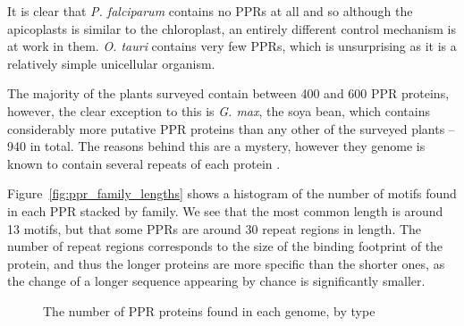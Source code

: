It is clear that \emph{P. falciparum} contains no PPRs at all and so
although the apicoplasts  is similar to the chloroplast, an entirely
different control mechanism is at work in them.
\emph{O. tauri} contains very few PPRs, which is unsurprising as it is a
relatively simple unicellular organism.

The majority of the plants surveyed contain between 400 and 600 PPR proteins,
however, the clear exception to this is \emph{G. max}, the soya bean, 
which contains considerably more putative PPR proteins than any other of the 
surveyed plants -- 940 in total.
The reasons behind this are a mystery, however they genome is known to contain
several repeats of each protein \citep{Schmutz2010}.

Figure~\ref{fig:ppr_family_lengths} shows a histogram of the number of motifs
found in each PPR stacked by family.
We see that the most common length is around 13 motifs, but that some PPRs are
around 30 repeat regions in length.
The number of repeat regions corresponds to the size of the binding footprint
of the protein, and thus the longer proteins are more specific than the shorter
ones, as the change of a longer sequence appearing by chance is significantly
smaller.


\begin{figure}
  \begin{center}
    \caption{The number of PPR proteins found in each genome, by type
      \label{fig:ppr_numbers}}
  \end{center}
\end{figure}

